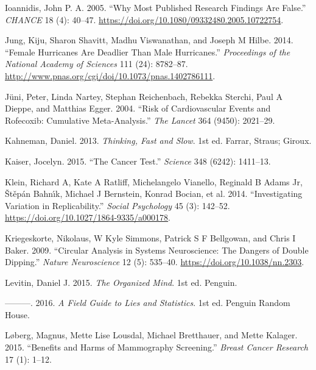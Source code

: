 \documentclass[
  10pt,
  b5paper]{book}
\newlength{\cslhangindent}
\newlength{\cslentryspacingunit} %
\newenvironment{CSLReferences}[2] %
 {%
  \setlength{\parindent}{0pt}
  \ifodd #1
  \let\oldpar\par
  \def\par{\hangindent=\cslhangindent\oldpar}
  \fi
  \setlength{\parskip}{#2\cslentryspacingunit}
 }%
 {}
\begin{document}
\begin{CSLReferences}{1}{0}
\leavevmode{}%
Ioannidis, John P. A. 2005. {``Why Most Published Research Findings Are False.''} \emph{CHANCE} 18 (4): 40--47. \url{https://doi.org/10.1080/09332480.2005.10722754}.

\leavevmode{}%
Jung, Kiju, Sharon Shavitt, Madhu Viswanathan, and Joseph M Hilbe. 2014. {``Female Hurricanes Are Deadlier Than Male Hurricanes.''} \emph{Proceedings of the National Academy of Sciences} 111 (24): 8782--87. \url{http://www.pnas.org/cgi/doi/10.1073/pnas.1402786111}.

\leavevmode{}%
Jüni, Peter, Linda Nartey, Stephan Reichenbach, Rebekka Sterchi, Paul A Dieppe, and Matthias Egger. 2004. {``Risk of Cardiovascular Events and Rofecoxib: Cumulative Meta-Analysis.''} \emph{The Lancet} 364 (9450): 2021--29.

\leavevmode{}%
Kahneman, Daniel. 2013. \emph{Thinking, Fast and Slow}. 1st ed. Farrar, Straus; Giroux.

\leavevmode{}%
Kaiser, Jocelyn. 2015. {``The Cancer Test.''} \emph{Science} 348 (6242): 1411--13.

\leavevmode{}%
Klein, Richard A, Kate A Ratliff, Michelangelo Vianello, Reginald B Adams Jr, Štěpán Bahnı́k, Michael J Bernstein, Konrad Bocian, et al. 2014. {``Investigating Variation in Replicability.''} \emph{Social Psychology} 45 (3): 142--52. \url{https://doi.org/10.1027/1864-9335/a000178}.

\leavevmode{}%
Kriegeskorte, Nikolaus, W Kyle Simmons, Patrick S F Bellgowan, and Chris I Baker. 2009. {``Circular Analysis in Systems Neuroscience: The Dangers of Double Dipping.''} \emph{Nature Neuroscience} 12 (5): 535--40. \url{https://doi.org/10.1038/nn.2303}.

\leavevmode{}%
Levitin, Daniel J. 2015. \emph{The Organized Mind}. 1st ed. Penguin.

\leavevmode{}%
---------. 2016. \emph{A Field Guide to Lies and Statistics}. 1st ed. Penguin Random House.

\leavevmode{}%
Løberg, Magnus, Mette Lise Lousdal, Michael Bretthauer, and Mette Kalager. 2015. {``Benefits and Harms of Mammography Screening.''} \emph{Breast Cancer Research} 17 (1): 1--12.


\end{CSLReferences}
\end{document}
